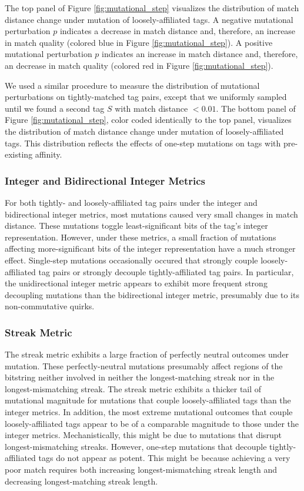The top panel of Figure \ref{fig:mutational_step} visualizes the distribution of match distance change under mutation of loosely-affiliated tags.
A negative mutational perturbation $p$ indicates a decrease in match distance and, therefore, an increase in match quality (colored blue in Figure \ref{fig:mutational_step}).
A positive mutational perturbation $p$ indicates an increase in match distance and, therefore, an decrease in match quality (colored red in Figure \ref{fig:mutational_step}).

We used a similar procedure to measure the distribution of mutational perturbations on tightly-matched tag pairs, except that we uniformly sampled until we found a second tag $S$ with match distance $< 0.01$.
The bottom panel of Figure \ref{fig:mutational_step}, color coded identically to the top panel, visualizes the distribution of match distance change under mutation of loosely-affiliated tags.
This distribution reflects the effects of one-step mutations on tags with pre-existing affinity.

\subsubsection{Integer and Bidirectional Integer Metrics}

For both tightly- and loosely-affiliated tag pairs under the integer and bidirectional integer metrics, most mutations caused very small changes in match distance.
These mutations toggle least-significant bits of the tag's integer representation.
However, under these metrics, a small fraction of mutations affecting more-significant bits of the integer representation have a much stronger effect.
Single-step mutations occasionally occured that strongly couple loosely-affiliated tag pairs or strongly decouple tightly-affiliated tag pairs.
In particular, the unidirectional integer metric appears to exhibit more frequent strong decoupling mutations than the bidirectional integer metric, presumably due to its non-commutative quirks.

\subsubsection{Streak Metric}

The streak metric exhibits a large fraction of perfectly neutral outcomes under mutation.
These perfectly-neutral mutations presumably affect regions of the bitstring neither involved in neither the longest-matching streak nor in the longest-mismatching streak.
The streak metric exhibits a thicker tail of mutational magnitude for mutations that couple loosely-affiliated tags than the integer metrics.
In addition, the most extreme mutational outcomes that couple loosely-affiliated tags appear to be of a comparable magnitude to those under the integer metrics.
Mechanistically, this might be due to mutations that disrupt longest-mismatching streaks.
However, one-step mutations that decouple tightly-affiliated tags do not appear as potent.
This might be because achieving a very poor match requires both increasing longest-mismatching streak length and decreasing longest-matching streak length.

